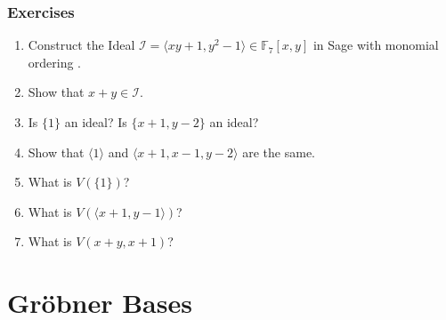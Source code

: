 \documentclass[9pt]{beamer}
\newcommand{\memph}[1]{{\color{yellow9}{\bf #1}}\xspace}
\newcommand{\F}[1][]{\ensuremath{\mathbb{F}_{#1}}\xspace}
\newcommand{\I}{\ensuremath{\mathcal{I}}\xspace}
\newcommand{\ideal}[1]{\ensuremath{\langle #1\rangle}\xspace}
\begin{document}
\begin{frame}
\frametitle{Exercises}
\begin{enumerate}
 \item Construct the Ideal $\I = \ideal{xy +1, y^2 -1} \in \F[7][x,y]$ in Sage with monomial ordering \memph{deglex}.
 \item Show that $x+y \in \I$.
 \item Is $\{1\}$ an ideal? Is $\{x + 1, y -2\}$ an ideal?
 \item Show that $\ideal{1}$ and $\ideal{x+1,x-1,y-2}$ are the same.
 \item What is $V(\{1\})$? 
 \item What is $V(\ideal{x+1, y-1})$?
 \item What is $V(x+y, x+1)$?
\end{enumerate}
 

\end{frame}

\section{Gröbner Bases}
\end{document}
